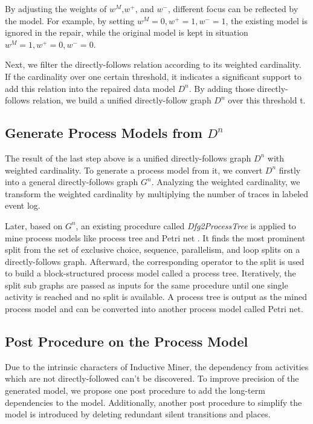 By adjusting the weights of $w^{M}$,$w^{+}$, and $w^{-}$, different focus can be reflected by the model. For example, by setting $w^{M}=0, w^{+}=1,w^{-}=1$, the existing model is ignored in the repair, while  the original model is kept in situation $w^{M}=1, w^{+}=0,w^{-}=0$.

Next, we filter the directly-follows relation according to its weighted cardinality. If the cardinality over one certain threshold, it indicates a significant support to add this relation into the repaired data model $D^n$. By adding those directly-follows relation, we build a unified directly-follow graph $D^n$ over this threshold t. 
\subsection{Generate Process Models from $D^n$}
The result of the last step above is a unified directly-follows graph $D^n$ with weighted cardinality. To generate a process model from it, we convert $D^n$ firstly into a general directly-follows graph $G^n$. Analyzing the weighted cardinality, we transform the weighted cardinality by multiplying the number of traces in labeled event log.


Later, based on $G^n$, an existing procedure called \emph{Dfg2ProcessTree} is applied to mine process models like process tree and Petri net \cite{leemans2013discovering}. It finds the most prominent split from the set of exclusive choice, sequence, parallelism, and loop splits on  a directly-follows graph.  Afterward, the corresponding operator to the split is used to build a block-structured process model called a process tree. Iteratively, the split sub graphs are passed as inputs for the same procedure until one single activity is reached and no split is available. A process tree is output as the mined process model and can be converted into another process model called Petri net.
\subsection{Post Procedure on the Process Model}
Due to the intrinsic characters of Inductive Miner, the dependency from activities which are not directly-followed can't be discovered. To improve precision of the generated model, we propose one post procedure to add the long-term dependencies to the model. Additionally, another post procedure to simplify the model is introduced by deleting redundant silent transitions and places.
